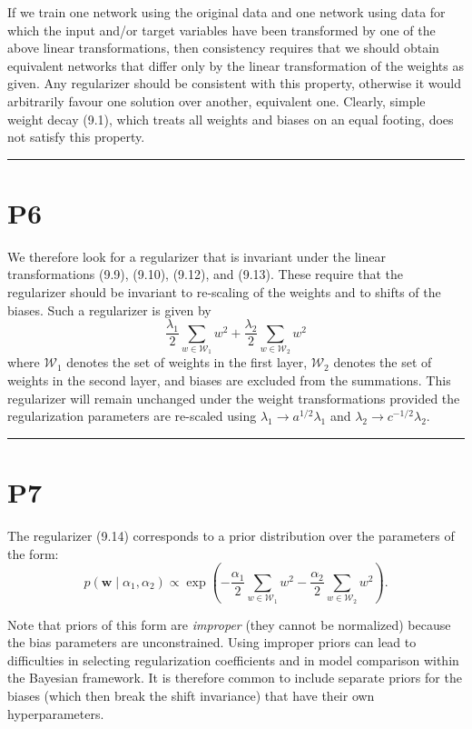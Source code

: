 \documentclass{article}
\begin{document}
If we train one network using the original data and one network using data for which the input and/or target variables have been transformed by one of the above linear transformations, then consistency requires that we should obtain equivalent networks that differ only by the linear transformation of the weights as given. Any regularizer should be consistent with this property, otherwise it would arbitrarily favour one solution over another, equivalent one. Clearly, simple weight decay (9.1), which treats all weights and biases on an equal footing, does not satisfy this property.

\noindent\rule{\linewidth}{0.4pt}

\section{P6}

We therefore look for a regularizer that is invariant under the linear transformations (9.9), (9.10), (9.12), and (9.13). These require that the regularizer should be invariant to re-scaling of the weights and to shifts of the biases. Such a regularizer is given by
\begin{equation}
\frac{\lambda_1}{2} \sum_{w \in \mathcal{W}_1} w^2 + \frac{\lambda_2}{2} \sum_{w \in \mathcal{W}_2} w^2
\tag{9.14}
\end{equation}
where $\mathcal{W}_1$ denotes the set of weights in the first layer, $\mathcal{W}_2$ denotes the set of weights in the second layer, and biases are excluded from the summations. This regularizer will remain unchanged under the weight transformations provided the regularization parameters are re-scaled using $\lambda_1 \to a^{1/2} \lambda_1$ and $\lambda_2 \to c^{-1/2} \lambda_2$.

\noindent\rule{\linewidth}{0.4pt}

\section{P7}

The regularizer (9.14) corresponds to a prior distribution over the parameters of the form:
\begin{equation}
p(\mathbf{w} \mid \alpha_1, \alpha_2) \propto \exp\left( -\frac{\alpha_1}{2} \sum_{w \in \mathcal{W}_1} w^2 - \frac{\alpha_2}{2} \sum_{w \in \mathcal{W}_2} w^2 \right).
\tag{9.15}
\end{equation}

Note that priors of this form are \emph{improper} (they cannot be normalized) because the bias parameters are unconstrained. Using improper priors can lead to difficulties in selecting regularization coefficients and in model comparison within the Bayesian framework. It is therefore common to include separate priors for the biases (which then break the shift invariance) that have their own hyperparameters.
\end{document}
